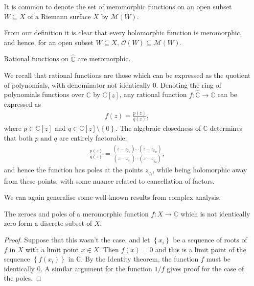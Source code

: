 \begin{notation}
	It is common to denote the set of meromorphic functions on an open subset $ W
		\subseteq X $ of a Riemann surface $ X $ by $ \mathcal{M}(W) $.
\end{notation}

\begin{example}
	From our definition it is clear that every holomorphic function is meromorphic,
	and hence, for an open subset $ W \subseteq X $, $ \mathcal{O}(W) \subseteq
		\mathcal{M}(W) $.
\end{example}

\begin{example}
	Rational functions on $ \hat{\mathbb{C}} $ are meromorphic.

	We recall that rational functions are those which can be expressed as the
	quotient of polynomials, with denominator not identically $ 0 $. Denoting the
	ring of polynomials functions over $ \mathbb{C} $ by $ \mathbb{C}[z] $, any
	rational function $ f: \hat{\mathbb{C}} \to \mathbb{C} $ can be expressed as
	\begin{align*}
		f(z) = \frac{p(z)}{q(z)},
	\end{align*}
	where $ p \in \mathbb{C}[z] $ and $ q \in \mathbb{C}[z]\setminus \left\{ 0
		\right\} $. The algebraic closedness of $ \mathbb{C} $ determines that both $ p
	$ and $ q $ are entirely factorable;
	\begin{align*}
		\frac{p(z)}{q(z)} = \frac{(z-z _{p_1})\cdots(z-z _{p_m})}{(z-z
		_{q_1})\cdots(z-z _{q_n})},
	\end{align*}
	and hence the function has poles at the points $ z _{q_i} $, while being
	holomorphic away from these points, with some nuance related to cancellation
	of factors.
\end{example}

We can again generalise some well-known results from complex analysis.

\begin{theorem}
	The zeroes and poles of a meromorphic function $ f:X \to \mathbb{C} $ which is
	not identically zero form a discrete subset of $ X $.
	\begin{proof}
		Suppose that this wasn't the case, and let $ \left\{ x_i \right\} $ be a
		sequence of roots of $ f $ in $ X $ with a limit point $ x \in X $. Then $
			f(x)=0 $ and this is a limit point of the sequence $ \left\{ f(x_i) \right\}
		$ in $ \mathbb{C} $. By the Identity theorem, the function $ f $ must be
		identically $ 0 $. A similar argument for the function $ 1/f $ gives proof
		for the case of the poles.
	\end{proof}
\end{theorem}

